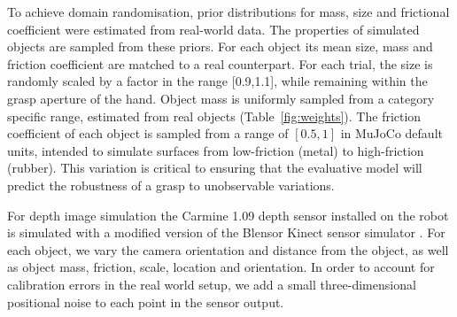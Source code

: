 To achieve domain randomisation, prior distributions for mass, size and frictional coefficient were estimated from real-world data. The properties of simulated objects are sampled from these priors. For each object its mean size, mass and friction coefficient are matched to a real counterpart. For each trial, the size is randomly scaled by a factor in the range [0.9,1.1], while remaining within the grasp aperture of the hand. Object mass is uniformly sampled from a category specific range, estimated from real objects (Table~\ref{fig:weights}). The friction coefficient of each object is sampled from a range of $[0.5, 1]$ in MuJoCo default units, intended to simulate surfaces from low-friction (metal) to high-friction (rubber). This variation is critical to ensuring that the evaluative model will predict the robustness of a grasp to unobservable variations.
\begin{table}[]
\centering
\caption{Mass ranges for each object class (grams).}
\label{fig:weights}
\end{table}
 
For depth image simulation the Carmine 1.09 depth sensor installed on the robot is simulated with a modified version of the Blensor Kinect sensor simulator \cite{KinectSimulator}. For each object, we vary the camera orientation and distance from the object, as well as object mass, friction, scale, location and orientation. In order to account for calibration errors in the real world setup, we add a small three-dimensional positional noise to each point in the sensor output.

